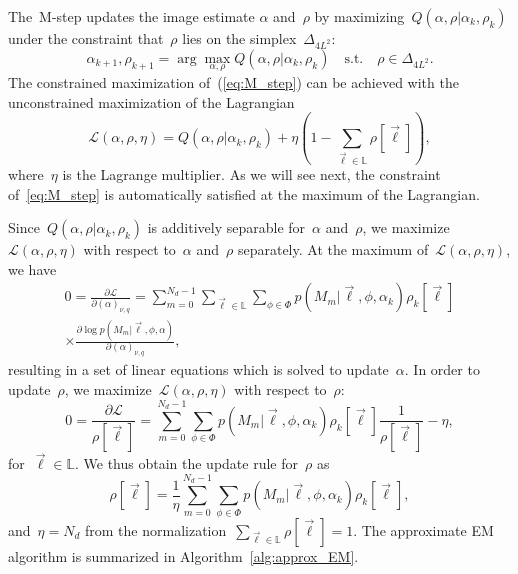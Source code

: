 \documentclass{article}
\begin{document}
The~\mbox{M-step} updates the image estimate $\alpha$ and~$\rho$ by maximizing~$Q(\alpha, \rho|\alpha_k, \rho_k)$ under the constraint that~$\rho$ lies on the simplex~$\Delta_{4L^2}$:
\begin{equation}
\label{eq:M_step}
\alpha_{k+1}, \rho_{k+1} = \arg \max_{\alpha, \rho} Q(\alpha, \rho|\alpha_k, \rho_k) \quad \text{s.t.} \quad  \rho \in \Delta_{4L^2}.
\end{equation}
The constrained maximization of~(\ref{eq:M_step}) can be achieved with the unconstrained maximization of the Lagrangian
\begin{equation}
\mathcal{L}(\alpha, \rho, \eta) = Q(\alpha, \rho|\alpha_k, \rho_k) + \eta \left(1 - \sum_{\vec{\ell} \in \mathbb{L}} \rho[\vec{\ell}] \right),
\end{equation}
where~$\eta$ is the Lagrange multiplier. As we will see next, the constraint of~\eqref{eq:M_step} is automatically satisfied at the   maximum of the Lagrangian.

 Since~$Q(\alpha, \rho|\alpha_k, \rho_k)$ is additively separable for~$\alpha$ and~$\rho$, we maximize~$\mathcal{L}(\alpha, \rho, \eta)$ with respect to~$\alpha$ and~$\rho$ separately. At the maximum of~$\mathcal{L}(\alpha, \rho, \eta)$, we have
\begin{multline}
\label{eq:update_alpha}
0 = \frac{\partial \mathcal{L}}{\partial{(\alpha)_{\nu, q}}} =  \sum_{m = 0}^{N_d - 1} \sum_{\vec{\ell} \in \mathbb{L}} \sum_{\phi \in \Phi} p(M_m|\vec{\ell}, \phi, \alpha_k) \rho_k[\vec{\ell}] \\ \times \frac{\partial \log p(M_m|\vec{\ell}, \phi, \alpha)}{\partial{(\alpha)_{\nu, q}}},
\end{multline}
resulting in a set of linear equations which is solved to update~$\alpha$. In order to update~$\rho$, we maximize~$\mathcal{L}(\alpha, \rho, \eta)$ with
respect to~$\rho$:
\begin{equation}
0 = \frac{\partial \mathcal{L}}{\mathcal \rho[\vec{\ell}]} = \sum_{m = 0}^{N_d - 1} \sum_{\phi \in \Phi} p(M_m|\vec{\ell}, \phi, \alpha_k) \rho_k[\vec{\ell}] \frac{1}{\rho[\vec{\ell}]} - \eta,
\end{equation}
for~$\vec{\ell} \in \mathbb{L}$. We thus obtain the update rule for~$\rho$ as
\begin{equation}
\label{eq:update_rho}
\rho[\vec{\ell}] = \frac{1}{\eta} \sum_{m = 0}^{N_d - 1} \sum_{\phi \in \Phi} p(M_m|\vec{\ell}, \phi, \alpha_k) \rho_k[\vec{\ell}],
\end{equation}
and~$\eta = N_d$ from the normalization~\mbox{$\sum_{\vec{\ell} \in \mathbb{L}} \rho[\vec{\ell}] = 1$}. The approximate EM algorithm is summarized in Algorithm~\ref{alg:approx_EM}.
\end{document}
